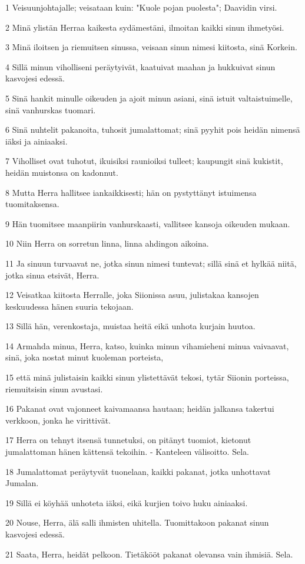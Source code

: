 \par 1 Veisuunjohtajalle; veisataan kuin: "Kuole pojan puolesta"; Daavidin virsi.
\par 2 Minä ylistän Herraa kaikesta sydämestäni, ilmoitan kaikki sinun ihmetyösi.
\par 3 Minä iloitsen ja riemuitsen sinussa, veisaan sinun nimesi kiitosta, sinä Korkein.
\par 4 Sillä minun viholliseni peräytyivät, kaatuivat maahan ja hukkuivat sinun kasvojesi edessä.
\par 5 Sinä hankit minulle oikeuden ja ajoit minun asiani, sinä istuit valtaistuimelle, sinä vanhurskas tuomari.
\par 6 Sinä nuhtelit pakanoita, tuhosit jumalattomat; sinä pyyhit pois heidän nimensä iäksi ja ainiaaksi.
\par 7 Viholliset ovat tuhotut, ikuisiksi raunioiksi tulleet; kaupungit sinä kukistit, heidän muistonsa on kadonnut.
\par 8 Mutta Herra hallitsee iankaikkisesti; hän on pystyttänyt istuimensa tuomitaksensa.
\par 9 Hän tuomitsee maanpiirin vanhurskaasti, vallitsee kansoja oikeuden mukaan.
\par 10 Niin Herra on sorretun linna, linna ahdingon aikoina.
\par 11 Ja sinuun turvaavat ne, jotka sinun nimesi tuntevat; sillä sinä et hylkää niitä, jotka sinua etsivät, Herra.
\par 12 Veisatkaa kiitosta Herralle, joka Siionissa asuu, julistakaa kansojen keskuudessa hänen suuria tekojaan.
\par 13 Sillä hän, verenkostaja, muistaa heitä eikä unhota kurjain huutoa.
\par 14 Armahda minua, Herra, katso, kuinka minun vihamieheni minua vaivaavat, sinä, joka nostat minut kuoleman porteista,
\par 15 että minä julistaisin kaikki sinun ylistettävät tekosi, tytär Siionin porteissa, riemuitsisin sinun avustasi.
\par 16 Pakanat ovat vajonneet kaivamaansa hautaan; heidän jalkansa takertui verkkoon, jonka he virittivät.
\par 17 Herra on tehnyt itsensä tunnetuksi, on pitänyt tuomiot, kietonut jumalattoman hänen kättensä tekoihin. - Kanteleen välisoitto. Sela.
\par 18 Jumalattomat peräytyvät tuonelaan, kaikki pakanat, jotka unhottavat Jumalan.
\par 19 Sillä ei köyhää unhoteta iäksi, eikä kurjien toivo huku ainiaaksi.
\par 20 Nouse, Herra, älä salli ihmisten uhitella. Tuomittakoon pakanat sinun kasvojesi edessä.
\par 21 Saata, Herra, heidät pelkoon. Tietäkööt pakanat olevansa vain ihmisiä. Sela.

